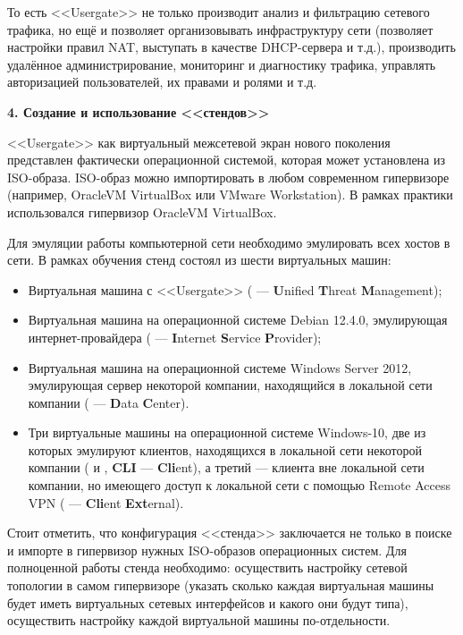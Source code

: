 То есть <<Usergate>> не только производит анализ и фильтрацию сетевого трафика, но ещё и позволяет организовывать инфраструктуру сети (позволяет настройки правил NAT, выступать в качестве DHCP-сервера и т.д.), производить удалённое администрирование, мониторинг и диагностику трафика, управлять авторизацией пользователей, их правами и ролями и т.д.

\begin{center}
	\textbf{\Large 4. Создание и использование <<стендов>>}
\end{center}

<<Usergate>> как виртуальный межсетевой экран нового поколения представлен фактически операционной системой, которая может установлена из ISO-образа. ISO-образ можно импортировать в любом современном гипервизоре (например, OracleVM VirtualBox или VMware Workstation). В рамках практики использовался гипервизор OracleVM VirtualBox.
		
Для эмуляции работы компьютерной сети необходимо эмулировать всех хостов в сети. В рамках обучения стенд состоял из шести виртуальных машин:
		
\begin{itemize}
	\item Виртуальная машина с <<Usergate>> (\UTM{} --- \textbf{U}nified \textbf{T}hreat \textbf{M}anagement);
			
	\item Виртуальная машина на операционной системе Debian 12.4.0, эмулирующая интернет-провайдера (\ISP{} --- \textbf{I}nternet \textbf{S}ervice \textbf{P}rovider);
			
	\item Виртуальная машина на операционной системе Windows Server 2012, эмулирующая сервер некоторой компании, находящийся в локальной сети компании (\DC{} --- \textbf{D}ata \textbf{C}enter).
			
	\item Три виртуальные машины на операционной системе Windows-10, две из которых эмулируют клиентов, находящихся в локальной сети некоторой компании (\CLIA{} и \CLIB{}, \textbf{CLI} --- \textbf{Cli}ent), а третий --- клиента вне локальной сети компании, но имеющего доступ к локальной сети с помощью Remote Access VPN (\CLIEXT{} --- \textbf{Cli}ent \textbf{Ext}ernal).
\end{itemize}
		
Стоит отметить, что конфигурация <<стенда>> заключается не только в поиске и импорте в гипервизор нужных ISO-образов операционных систем. Для полноценной работы стенда необходимо: осуществить настройку сетевой топологии в самом гипервизоре (указать сколько каждая виртуальная машины будет иметь виртуальных сетевых интерфейсов и какого они будут типа), осуществить настройку каждой виртуальной машины по-отдельности. 
		
